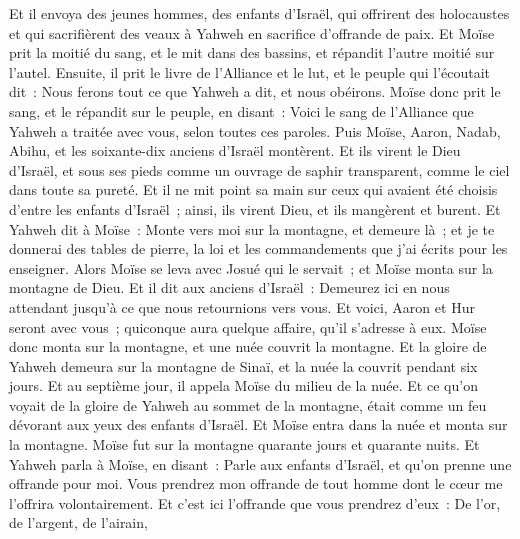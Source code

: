 \begin{multicols}{2}
Et il envoya des jeunes hommes, des enfants d'Israël, qui offrirent des holocaustes et qui sacrifièrent des veaux à Yahweh en sacrifice d'offrande de paix.
Et Moïse prit la moitié du sang, et le mit dans des bassins, et répandit l'autre moitié sur l'autel.
Ensuite, il prit le livre de l'Alliance et le lut, et le peuple qui l'écoutait dit~: Nous ferons tout ce que Yahweh a dit, et nous obéirons.
Moïse donc prit le sang, et le répandit sur le peuple, en disant~: Voici le sang de l'Alliance que Yahweh a traitée avec vous, selon toutes ces paroles.
Puis Moïse, Aaron, Nadab, Abihu, et les soixante-dix anciens d'Israël montèrent.
Et ils virent le Dieu d'Israël, et sous ses pieds comme un ouvrage de saphir transparent, comme le ciel dans toute sa pureté.
Et il ne mit point sa main sur ceux qui avaient été choisis d'entre les enfants d'Israël~; ainsi, ils virent Dieu, et ils mangèrent et burent.
Et Yahweh dit à Moïse~: Monte vers moi sur la montagne, et demeure là~; et je te donnerai des tables de pierre, la loi et les commandements que j'ai écrits pour les enseigner.
Alors Moïse se leva avec Josué qui le servait~; et Moïse monta sur la montagne de Dieu.
Et il dit aux anciens d'Israël~: Demeurez ici en nous attendant jusqu'à ce que nous retournions vers vous. Et voici, Aaron et Hur seront avec vous~; quiconque aura quelque affaire, qu'il s'adresse à eux.
Moïse donc monta sur la montagne, et une nuée couvrit la montagne.
Et la gloire de Yahweh demeura sur la montagne de Sinaï, et la nuée la couvrit pendant six jours. Et au septième jour, il appela Moïse du milieu de la nuée.
Et ce qu'on voyait de la gloire de Yahweh au sommet de la montagne, était comme un feu dévorant aux yeux des enfants d'Israël.
Et Moïse entra dans la nuée et monta sur la montagne. Moïse fut sur la montagne quarante jours et quarante nuits.
\VerseOne{}Et Yahweh parla à Moïse, en disant~:
Parle aux enfants d'Israël, et qu'on prenne une offrande pour moi. Vous prendrez mon offrande de tout homme dont le cœur me l'offrira volontairement.
Et c'est ici l'offrande que vous prendrez d'eux~: De l'or, de l'argent, de l'airain,

\end{multicols}
